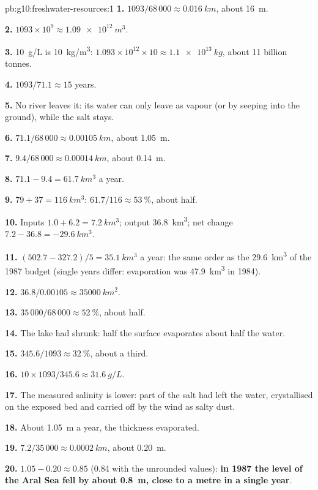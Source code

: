 \begin{solution}{pb:g10:freshwater-resources:1}
\textbf{1.} $1093/68\,000 \approx \qty{0.016}{km}$, about \qty{16}{m}.

\textbf{2.} $1093 \times 10^9 \approx \qty{1.09e12}{m^3}$.

\textbf{3.} \qty{10}{g/L} is \qty{10}{kg/m^3}: $1.093 \times 10^{12} \times 10
\approx \qty{1.1e13}{kg}$, about \num{11} billion tonnes.

\textbf{4.} $1093/71.1 \approx 15$ years.

\textbf{5.} No river leaves it: its water can only leave as vapour (or by
seeping into the ground), while the salt stays.

\textbf{6.} $71.1/68\,000 \approx \qty{0.00105}{km}$, about \qty{1.05}{m}.

\textbf{7.} $9.4/68\,000 \approx \qty{0.00014}{km}$, about \qty{0.14}{m}.

\textbf{8.} $71.1 - 9.4 = \qty{61.7}{km^3}$ a year.

\textbf{9.} $79 + 37 = \qty{116}{km^3}$: $61.7/116 \approx \qty{53}{\percent}$,
about half.

\textbf{10.} Inputs $1.0 + 6.2 = \qty{7.2}{km^3}$; output \qty{36.8}{km^3};
net change $7.2 - 36.8 = \qty{-29.6}{km^3}$.

\textbf{11.} $(502.7 - 327.2)/5 = \qty{35.1}{km^3}$ a year: the same order as
the \qty{29.6}{km^3} of the 1987 budget (single years differ: evaporation was
\qty{47.9}{km^3} in 1984).

\textbf{12.} $36.8/0.00105 \approx \qty{35000}{km^2}$.

\textbf{13.} $35\,000/68\,000 \approx \qty{52}{\percent}$, about half.

\textbf{14.} The lake had shrunk: half the surface evaporates about half the
water.

\textbf{15.} $345.6/1093 \approx \qty{32}{\percent}$, about a third.

\textbf{16.} $10 \times 1093/345.6 \approx \qty{31.6}{g/L}$.

\textbf{17.} The measured salinity is lower: part of the salt had left the
water, crystallised on the exposed bed and carried off by the wind as salty
dust.

\textbf{18.} About \qty{1.05}{m} a year, the thickness evaporated.

\textbf{19.} $7.2/35\,000 \approx \qty{0.0002}{km}$, about \qty{0.20}{m}.

\textbf{20.} $1.05 - 0.20 \approx 0.85$ (\num{0.84} with the unrounded values):
\textbf{in 1987 the level of the Aral Sea fell by about \qty{0.8}{m}, close to
a metre in a single year}.
\end{solution}
